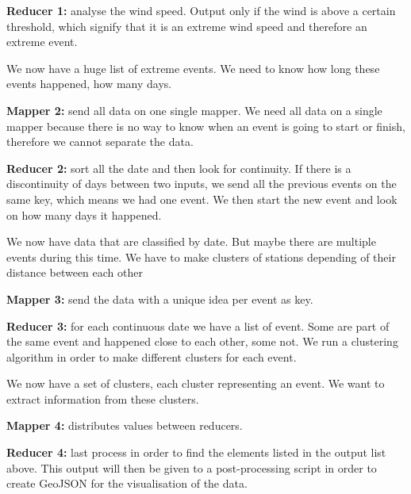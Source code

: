 \textbf{Reducer 1:} analyse the wind speed. Output only if the wind is above a certain threshold, which signify that it is an extreme wind speed and therefore an extreme event.

We now have a huge list of extreme events. We need to know how long these events happened, how many days.

\textbf{Mapper 2:} send all data on one single mapper. We need all data on a single mapper because there is no way to know when an event is going to start or finish, therefore we cannot separate the data.

\textbf{Reducer 2:} sort all the date and then look for continuity. If there is a discontinuity of days between two inputs, we send all the previous events on the same key, which means we had one event. We then start the new event and look on how many days it happened.

We now have data that are classified by date. But maybe there are multiple events during this time. We have to make clusters of stations depending of their distance between each other

\textbf{Mapper 3:} send the data with a unique idea per event as key.

\textbf{Reducer 3:} for each continuous date we have a list of event. Some are part of the same event and happened close to each other, some not. We run a clustering algorithm in order to make different clusters for each event.

We now have a set of clusters, each cluster representing an event. We want to extract information from these clusters.

\textbf{Mapper 4:} distributes values between reducers.

\textbf{Reducer 4:} last process in order to find the elements listed in the output list above. This output will then be given to a post-processing script in order to create GeoJSON for the visualisation of the data.
